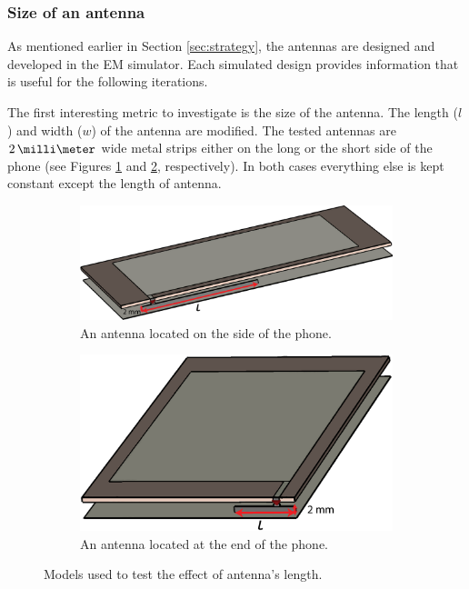 \subsubsection{Size of an antenna}
\label{sec:antenna_size}
As mentioned earlier in Section \ref{sec:strategy}, the antennas are designed and developed in the EM simulator. Each simulated design provides information that is useful for the following iterations. 

The first interesting metric to investigate is the size of the antenna. The length ($l$) and width ($w$) of the antenna are modified. The tested antennas are $2\,\milli\meter$ wide metal strips either on the long or the short side of the phone (see Figures \ref{fig:ant_length_long} and \ref{fig:ant_length_short}, respectively). In both cases everything else is kept constant except the length of antenna. 

\begin{figure}[H]
    \centering
    \begin{subfigure}[b]{0.49\textwidth}
        \includegraphics[width=\textwidth]{img/ant_length_long.eps}
        \caption{An antenna located on the side of the phone.}
        \label{fig:ant_length_long}
    \end{subfigure}
    \begin{subfigure}[b]{0.49\textwidth}
        \includegraphics[width=\textwidth]{img/ant_length_short.eps}
        \caption{An antenna located at the end of the phone.}
        \label{fig:ant_length_short}
    \end{subfigure}
    \caption{Models used to test the effect of antenna's length.}
    \label{fig:ant_length_model}
\end{figure}

